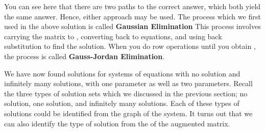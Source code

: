 You can see here that there are two paths to the correct answer, which both yield the
same answer. Hence, either approach may be used. The process which we first used in the above solution is called \textbf{Gaussian Elimination} 
This process involves carrying the matrix to \ef, converting back to equations, and using back substitution to find the solution. 
When you do row operations until you obtain \rref, the process is
called \textbf{Gauss-Jordan Elimination}. 

We have now found solutions for systems of equations with no solution and infinitely many solutions, with one parameter as well as two parameters. 
Recall the three types of solution sets which we discussed in the previous section; no solution, one solution, and infinitely many solutions. Each of these
types of solutions could be identified from the graph of the system. It turns out that we can also identify the type of solution
from the \rref \;of the augmented matrix.

